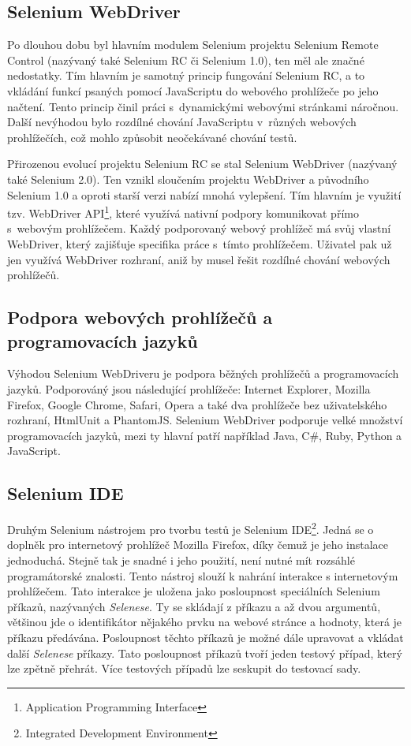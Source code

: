 \documentclass[
    color,   %
	table,   %
    twoside, %
    nolot, nolof
]{fithesis3}
\begin{document}
\subsection{Selenium WebDriver}
Po dlouhou dobu byl hlavním modulem Selenium projektu Selenium Remote Control (nazývaný také Selenium RC či Selenium 1.0), ten měl ale značné nedostatky. Tím hlavním je samotný princip fungování Selenium RC, a to vkládání funkcí psaných pomocí JavaScriptu do webového prohlížeče po jeho načtení. Tento princip činil práci s~dynamickými webovými stránkami náročnou. Další nevýhodou bylo rozdílné chování JavaScriptu v~různých webových prohlížečích, což mohlo způsobit neočekávané chování testů.

Přirozenou evolucí projektu Selenium RC se stal Selenium WebDriver (nazývaný také Selenium 2.0). Ten vznikl sloučením projektu WebDriver a původního Selenium 1.0 a oproti starší verzi nabízí mnohá vylepšení. Tím hlavním je využití tzv. WebDriver API\footnote{Application Programming Interface}, které využívá nativní podpory komunikovat přímo s~webovým prohlížečem. Každý podporovaný webový prohlížeč má svůj vlastní WebDriver, který zajišťuje specifika práce s~tímto prohlížečem. Uživatel pak už jen využívá WebDriver rozhraní, aniž by musel řešit rozdílné chování webových prohlížečů. 

\subsection*{Podpora webových prohlížečů a programovacích jazyků}
Výhodou Selenium WebDriveru je podpora běžných prohlížečů a programovacích jazyků. Podporováný jsou následující prohlížeče: Internet Explorer, Mozilla Firefox, Google Chrome, Safari, Opera a také dva prohlížeče bez uživatelského rozhraní, HtmlUnit a PhantomJS. Selenium WebDriver podporuje velké množství programovacích jazyků, mezi ty hlavní patří například Java, C\#, Ruby, Python a JavaScript.

\subsection{Selenium IDE}

Druhým Selenium nástrojem pro tvorbu testů je Selenium IDE\footnote{Integrated Development Environment}. Jedná se o doplněk pro internetový prohlížeč Mozilla Firefox, díky čemuž je jeho instalace jednoduchá. Stejně tak je snadné i jeho použití, není nutné mít rozsáhlé programátorské znalosti. Tento nástroj slouží k nahrání interakce s internetovým prohlížečem. Tato interakce je uložena jako posloupnost speciálních Selenium příkazů, nazývaných \emph{Selenese}. Ty se skládají z příkazu a až dvou argumentů, většinou jde o identifikátor nějakého prvku na webové stránce a hodnoty, která je příkazu předávána. Posloupnost těchto příkazů je možné dále upravovat a vkládat další \emph{Selenese} příkazy. Tato posloupnost příkazů tvoří jeden testový případ, který lze zpětně přehrát. Více testových případů lze seskupit do testovací sady. \cite{Selenium}
\end{document}
